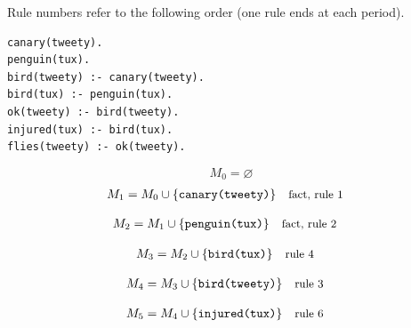 \documentclass[a4paper,11pt]{article}
\newif\ifexplain
\newcommand{\explain}[1]{\ifexplain\begin{erklbox}#1\end{erklbox}\fi}
\newcommand{\why}[1]{\text{\small #1}}
\newcommand{\at}[1]{\texttt{#1}}
\begin{document}
Rule numbers refer to the following order (one rule ends at each period).
\begin{small}
\begin{verbatim}
canary(tweety).
penguin(tux).
bird(tweety) :- canary(tweety).
bird(tux) :- penguin(tux).
ok(tweety) :- bird(tweety).
injured(tux) :- bird(tux).
flies(tweety) :- ok(tweety).
\end{verbatim}
\end{small}
\explain{Beim Redukt bleibt die Kandidatenmenge fest. Wir entscheiden zuerst, welche Regeln wegfallen. Erst danach berechnen wir aus den verbleibenden positiven Regeln die kleinste abgeschlossene Menge. Ein Modell allein reicht nicht: Diese Menge muss genau der Kandidat sein.}
\[
M_0=\varnothing
\]
\begin{align*}
M_{1} &= M_{0}\cup \{\at{canary(tweety)}\} && \why{fact, rule 1}
\end{align*}
\explain{Diese Regel hat keinen Körper. Ihr Kopf $\at{canary(tweety)}$ ist damit ein Fakt und muss in die Menge.}
\begin{align*}
M_{2} &= M_{1}\cup \{\at{penguin(tux)}\} && \why{fact, rule 2}
\end{align*}
\explain{Diese Regel hat keinen Körper. Ihr Kopf $\at{penguin(tux)}$ ist damit ein Fakt und muss in die Menge.}
\begin{align*}
M_{3} &= M_{2}\cup \{\at{bird(tux)}\} && \why{rule 4}
\end{align*}
\explain{Für $\at{bird(tux)}$ brauchen wir $\at{penguin(tux)}$. Weil diese Voraussetzungen bereits hergeleitet sind, dürfen wir den Regelkopf jetzt aufnehmen und alle bisherigen Atome behalten; bei einer fehlenden Voraussetzung würde diese Regel dagegen noch nichts beitragen.}
\begin{align*}
M_{4} &= M_{3}\cup \{\at{bird(tweety)}\} && \why{rule 3}
\end{align*}
\explain{Für $\at{bird(tweety)}$ brauchen wir $\at{canary(tweety)}$. Weil diese Voraussetzungen bereits hergeleitet sind, dürfen wir den Regelkopf jetzt aufnehmen und alle bisherigen Atome behalten; bei einer fehlenden Voraussetzung würde diese Regel dagegen noch nichts beitragen.}
\begin{align*}
M_{5} &= M_{4}\cup \{\at{injured(tux)}\} && \why{rule 6}
\end{align*}
\explain{Für $\at{injured(tux)}$ brauchen wir $\at{bird(tux)}$. Weil diese Voraussetzungen bereits hergeleitet sind, dürfen wir den Regelkopf jetzt aufnehmen und alle bisherigen Atome behalten; bei einer fehlenden Voraussetzung würde diese Regel dagegen noch nichts beitragen.}
\end{document}
